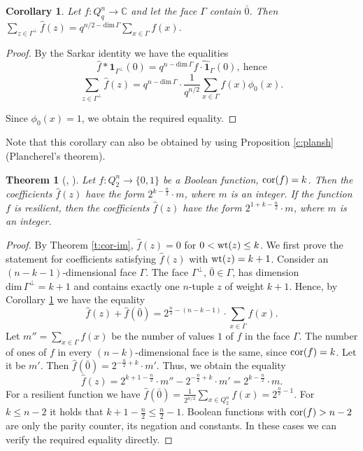 \documentclass[11pt]{article}
\newtheorem{theorem}{Theorem}[section]
\newtheorem{corollary}{Corollary}[section]
\theoremstyle{definition}
\newcommand{\wt}{{\rm wt}}
\newcommand{\cor}{{\rm cor}}
\begin{document}
{{{\begin{corollary}\label{cor:Sar}
Let $f:Q^n_q\rightarrow \mathbb{C}$ and let the face $\Gamma$ contain $\bar{0}$. Then $\sum\limits_{z\in\Gamma^\perp}\widehat{f}(z)=
q^{n/2-\mathrm{dim}\,\Gamma}\sum\limits_{x\in\Gamma}f(x)$.

\end{corollary}
\begin{proof}
By the Sarkar identity we have the equalities
    \[
    \widehat{f}*{\mathbf 1}_{\Gamma^\perp}(0)=q^{n-\mathrm{dim}\,\Gamma}
    \widehat{f\cdot{\mathbf 1}_{\Gamma}}(0),\ \mbox{hence}
    \]
\[
\sum\limits_{z\in\Gamma^\perp}\widehat{f}(z)=q^{n-\mathrm{dim}\,\Gamma}\cdot
\frac{1}{q^{n/2}}\sum\limits_{x\in\Gamma}
f(x)\phi_0(x).
\]

Since $\phi_0(x)= 1$, we obtain the required equality.
\end{proof}

Note that this corollary can also be obtained by using Proposition \ref{c:plansh} (Plancherel's theorem).


\begin{theorem}[\cite{Carlet20}, \cite{Taran02}] \label{cor:Sar0}
    Let $f:Q^n_2\rightarrow \{0,1\}$ be a Boolean function, $\cor(f)=k$.
    Then the coefficients $\widehat{f}(z)$ have the form $2^{k-\frac{n}{2}}\cdot m$, where $m$ is an integer. If the function $f$ is resilient, then the coefficients $\widehat{f}(z)$  have the form $2^{1+k-\frac{n}{2}}\cdot m$, where $m$ is an integer.
\end{theorem}
\begin{proof}
By Theorem \ref{t:cor-im}, $\widehat{f}(z)=0$ for $0<\wt(z)\le k$.
We first prove the statement for coefficients satisfying $\widehat{f}(z)$ with $\wt(z)=k+1$.
    Consider an $(n-k-1)$-dimensional face $\Gamma$. The face $\Gamma^\perp$,
     $\bar{0}\in \Gamma$, has dimension
     $\mathrm{dim}\,\Gamma^\perp=k+1$ and
      contains exactly one $n$-tuple $z$ of weight $k+1$. Hence, by 
       Corollary \ref{cor:Sar} we have the equality
        \[
    \widehat{f}(z)+\widehat{f}(\bar
    0)=2^{\frac{n}{2}-(n-k-1)}\cdot\sum\limits_{x\in\Gamma}f(x).
    \]
    Let $m''=\sum\limits_{x\in\Gamma}f(x)$ be the number of values $1$ of  $f$
     in the face $\Gamma$.
         The number of ones  of $f$ in  every $(n-k)$-dimensional face is the same, since $\cor(f)=k$.    Let it be  $m'$. Then $\widehat{f}(\bar   0)=2^{-\frac{n}{2}+k}\cdot
    m'$.
      Thus, we obtain the equality
    \[
    \widehat{f}(z)=2^{k+1-\frac{n}{2}}\cdot m''-2^{-\frac{n}{2}+k}\cdot
    m'=2^{k-\frac{n}{2}}\cdot m .
    \]
    For a resilient function we have $\widehat{f}(\bar
0)=\frac{1}{2^{n/2}}\sum\limits_{x\in Q^n_2}f(x)=2^{\frac{n}{2}-1}$.
For $k\leq n-2$ it holds that $k+1-\frac{n}{2}\leq \frac{n}{2}-1$.
Boolean functions with $\cor(f)>n-2$ are only the parity counter, its negation and constants. In these cases we can verify the required
equality directly.


\end{proof}}}}
\end{document}
